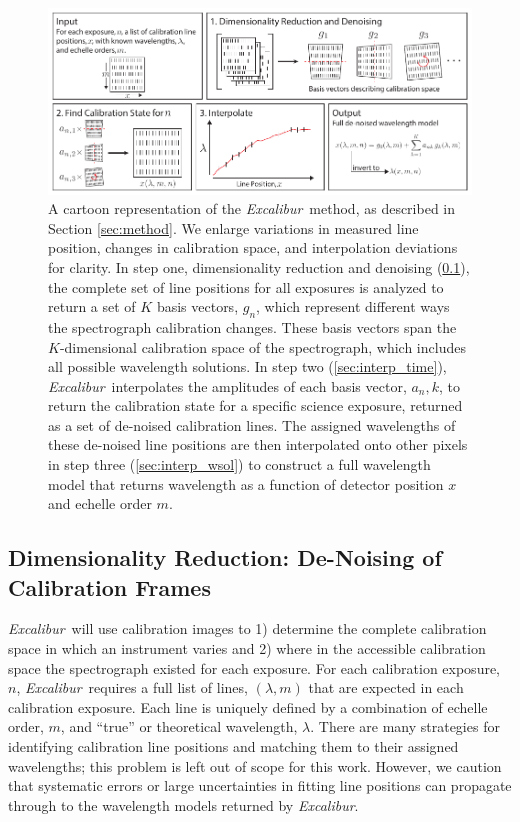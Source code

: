 \documentclass[modern]{aastex63}
\newcommand{\project}[1]{\textsl{#1}}
\newcommand{\name}{\project{Excalibur}}
\begin{document}
\begin{figure}[t]
\centering
\includegraphics[width=\textwidth]{Figures/methodCartoon.pdf}
\caption{A cartoon representation of the \name\ method, as described in Section \ref{sec:method}.  We enlarge variations in measured line position, changes in calibration space, and interpolation deviations for clarity.  In step one, dimensionality reduction and denoising (\textsection \ref{sec:denoising}), the complete set of line positions for all exposures is analyzed to return a set of $K$ basis vectors, $g_n$, which represent different ways the spectrograph calibration changes.  These basis vectors span the $K$-dimensional calibration space of the spectrograph, which includes all possible wavelength solutions.  In step two (\textsection \ref{sec:interp_time}), \name\ interpolates the amplitudes of each basis vector, $a_n,k$, to return the calibration state for a specific science exposure, returned as a set of de-noised calibration lines.  The assigned wavelengths of these de-noised line positions are then interpolated onto other pixels in step three (\textsection \ref{sec:interp_wsol}) to construct a full wavelength model that returns wavelength as a function of detector position $x$ and echelle order $m$.}
\label{fig:cartoon}
\end{figure} 

\subsection{Dimensionality Reduction: De-Noising of Calibration Frames} \label{sec:denoising}
\name\ will use calibration images to  1) determine the complete calibration space in which an instrument varies and 2) where in the accessible calibration space the spectrograph existed for each exposure.  For each calibration exposure, $n$, \name\ requires a full list of lines, $(\lambda,m)$ that are expected in each calibration exposure.  Each line is uniquely defined by a combination of echelle order, $m$, and ``true'' or theoretical wavelength, $\lambda$.  There are many strategies for identifying calibration line positions and matching them to their assigned wavelengths; this problem is left out of scope for this work.  However, we caution that systematic errors or large uncertainties in fitting line positions can propagate through to the wavelength models returned by \name.
\end{document}
